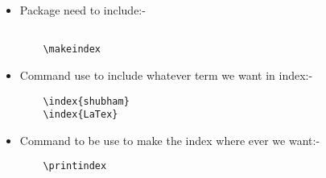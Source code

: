 \begin{itemize}
    \item Package need to include:-
    \begin{verbatim}
    
    \makeindex
    \end{verbatim}

    \item Command use to include whatever term we want in index:-
    \begin{verbatim}
    \index{shubham}
    \index{LaTex}
    \end{verbatim}

    \item Command to be use to make the index where ever we want:-
    \begin{verbatim}
    \printindex
    \end{verbatim}
\end{itemize}















